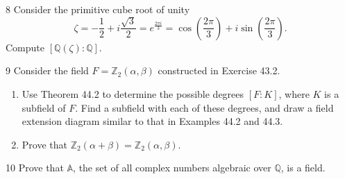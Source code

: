 \begin{problem}{8}
    Consider the primitive cube root of unity
    \[\zeta = -\frac{1}{2} + i\frac{\sqrt{3}}{2} = e^{\frac{2\pi i}{3}}
    = \cos\left(\frac{2\pi}{3}\right) + i\sin\left(\frac{2\pi}{3}\right).\]
    Compute $[\mathbb{Q}(\zeta) : \mathbb{Q}]$.
\end{problem}
\unsolved

\begin{problem}{9}
    Consider the field $F = \mathbb{Z}_2(\alpha, \beta)$ constructed in Exercise 43.2.
    \begin{enumerate}
        \item[(a)] Use Theorem 44.2 to determine the possible degrees $[F : K]$, where $K$
        is a subfield of $F$. Find a subfield with each of these degrees, and draw a field
        extension diagram similar to that in Examples 44.2 and 44.3.
        \item[(b)] Prove that $\mathbb{Z}_2(\alpha + \beta) = \mathbb{Z}_2(\alpha, \beta)$.
    \end{enumerate}
\end{problem}
\unsolved

\begin{problem}{10}
    Prove that $\mathbb{A}$, the set of all complex numbers algebraic over $\mathbb{Q}$, is
    a field.
\end{problem}
\unsolved

